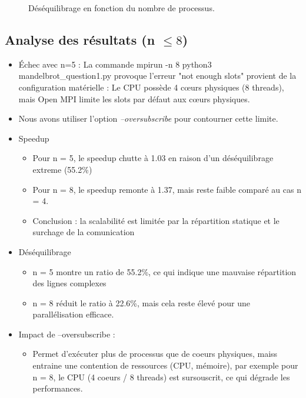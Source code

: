 \documentclass[a4paper,13pt]{book}
\begin{document}
\begin{figure}[ht]
  \centering
  \caption{Déséquilibrage en fonction du nombre de processus.}
  \label{fig:desequilibre}
\end{figure}
\subsection{Analyse des résultats (n $\leq 8$)}
\begin{itemize}
\item Échec avec n=5 : La commande mpirun -n 8 python3 mandelbrot\_question1.py provoque l’erreur "not enough slots" provient de la configuration matérielle : Le CPU possède 4 cœurs physiques (8 threads), mais Open MPI limite les slots par défaut aux cœurs physiques.
\item Nous avons utiliser l'option \emph{--oversubscribe} pour contourner cette limite.
\item Speedup
\begin{itemize}
  \item Pour n = 5, le speedup chutte à 1.03 en raison d'un déséquilibrage extreme (55.2\%)
  \item Pour n = 8, le speedup remonte à 1.37, mais reste faible comparé au cas n = 4.
  \item Conclusion : la scalabilité est limitée par la répartition statique et le surchage de la comunication
\end{itemize}
\item Déséquilibrage 
\begin{itemize}
  \item n = 5 montre un ratio de 55.2\%, ce qui indique une mauvaise répartition des lignes complexes 
  \item n = 8 réduit le ratio à 22.6\%, mais cela reste élevé pour une parallélisation efficace.
\end{itemize}
\item Impact de --oversubscribe : 
\begin{itemize}
  \item Permet d'exécuter plus de processus que de coeurs physiques, maiss entraine une contention de ressources (CPU, mémoire), par exemple pour n = 8, le CPU (4 coeurs / 8 threads) est sursouscrit, ce qui dégrade les performances.
\end{itemize}
\end{itemize}
\clearpage
\end{document}
